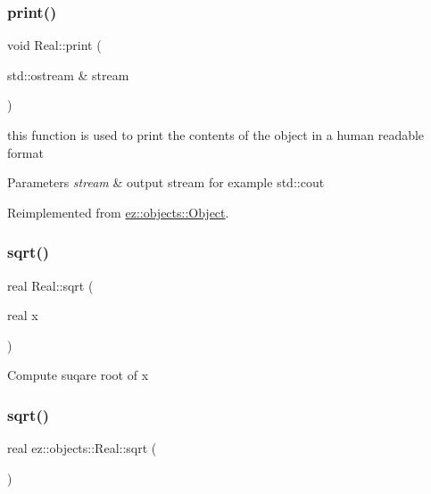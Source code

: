 \subsubsection{\texorpdfstring{print()}{print()}}
{\footnotesize\ttfamily void Real\+::print (\begin{DoxyParamCaption}\item[{std\+::ostream \&}]{stream }\end{DoxyParamCaption})\hspace{0.3cm}{\ttfamily [virtual]}}

this function is used to print the contents of the object in a human readable format 
\begin{DoxyParams}{Parameters}
{\em stream} & output stream for example std\+::cout \\
\hline
\end{DoxyParams}


Reimplemented from \hyperlink{classez_1_1objects_1_1Object_a9e20f39a78163f67f000576149d858b3}{ez\+::objects\+::\+Object}.

\mbox{\label{classez_1_1objects_1_1Real_a0262710806e8acf0cd731736abd40c73}} 
\subsubsection{\texorpdfstring{sqrt()}{sqrt()}\hspace{0.1cm}{\footnotesize\ttfamily [1/2]}}
{\footnotesize\ttfamily real Real\+::sqrt (\begin{DoxyParamCaption}\item[{real}]{x }\end{DoxyParamCaption})\hspace{0.3cm}{\ttfamily [static]}}

Compute suqare root of x \mbox{\label{classez_1_1objects_1_1Real_abb95328dc5b8fa45590968bf8f91ae9b}} 
\subsubsection{\texorpdfstring{sqrt()}{sqrt()}\hspace{0.1cm}{\footnotesize\ttfamily [2/2]}}
{\footnotesize\ttfamily real ez\+::objects\+::\+Real\+::sqrt (\begin{DoxyParamCaption}{ }\end{DoxyParamCaption})\hspace{0.3cm}{\ttfamily [inline]}}


